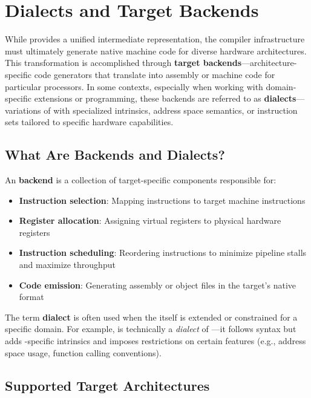 \section{ Dialects and Target Backends}

While   provides a unified intermediate representation, the compiler infrastructure must ultimately generate native machine code for diverse hardware architectures. This transformation is accomplished through \textbf{target backends}---architecture-specific code generators that translate   into assembly or machine code for particular processors. In some contexts, especially when working with domain-specific extensions or  programming, these backends are referred to as \textbf{ dialects}---variations of   with specialized intrinsics, address space semantics, or instruction sets tailored to specific hardware capabilities.

\subsection{What Are  Backends and Dialects?}

An  \textbf{backend} is a collection of target-specific components responsible for:

\begin{itemize}[noitemsep]
  \item \textbf{Instruction selection}: Mapping   instructions to target machine instructions
  \item \textbf{Register allocation}: Assigning virtual registers to physical hardware registers
  \item \textbf{Instruction scheduling}: Reordering instructions to minimize pipeline stalls and maximize throughput
  \item \textbf{Code emission}: Generating assembly or object files in the target's native format
\end{itemize}

The term \textbf{dialect} is often used when the  itself is extended or constrained for a specific domain. For example,   is technically a \textit{dialect} of  ---it follows  syntax but adds -specific intrinsics and imposes restrictions on certain features (e.g., address space usage, function calling conventions).

\subsection{Supported  Target Architectures}

